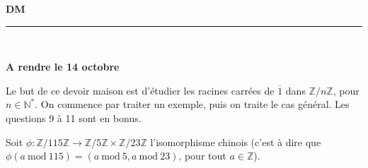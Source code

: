 \documentclass[11pt,a4paper]{article}
\title{}
\date{}
\newcommand{\HRule}{\rule{\linewidth}{0.5mm}}
\begin{document}
\pagestyle{fancy}

\fancyhead{}
 \fancyfoot{}


\newcommand{\lb}{\llbracket}
\newcommand{\rb}{\rrbracket}
\newcommand{\N}{\mathbb{N}}
\newcommand{\Z}{\mathbb{Z}}




\newcommand{\md}[3]{#1\ \equiv \ #2 \! \! \! \! \! \pmod {#3} }
\newcommand{\nmd}[3]{#1 \not \equiv #2 \! \! \! \! \!  \pmod {#3} }
\newcommand{\mda}[3]{#1 \equiv #2 \! \!  \pmod {#3} }
\newcommand{\nmda}[3]{#1 \not \equiv #2 \! \! \pmod {#3} }
\newcommand{\mo}[2]{#1 \! \! \! \! \! \pmod #2 }
\newcommand{\moa}[2]{#1 \! \!  \pmod {#2} }

\thispagestyle{fancy}

\begin{center}
    { \huge \bfseries
    DM 
     \\ [0cm] }
    \HRule \\[0.5cm]
\end{center}






\begin{center}
\textbf{A rendre le 14 octobre}
\end{center}

Le but de ce devoir maison est d'étudier les racines carrées de $\overline{1}$ dans $\Z/n\Z$, pour $n\in \N^*$. On commence par traiter un exemple, puis on traite le cas général. Les questions 9 à 11 sont en bonus.

Soit $\phi:\Z/115\Z\rightarrow \Z/5\Z\times \Z/23\Z$ l'isomorphisme chinois (c'est à dire que $\phi(a\mathrm{\ mod\ }115)=(a\mathrm{\ mod\ }5, a\mathrm{\ mod\ }23)$, pour tout $a\in \Z$).
\end{document}
